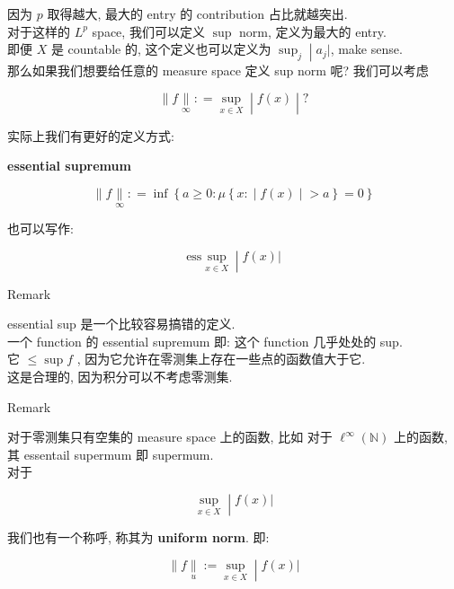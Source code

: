 \documentclass{qlnotes-export}
\begin{document}
因为 \(p\) 取得越大, 最大的 entry 的 contribution 占比就越突出.\\
对于这样的 \(L^{p}\) space, 我们可以定义 \(\sup\) norm, 定义为最大的 entry.\\
即便 \(X\) 是 countable 的, 这个定义也可以定义为 \(\left. \sup_{j} \middle| a_{j}| \right.\), make sense.\\
那么如果我们想要给任意的 measure space 定义 sup norm 呢? 我们可以考虑

\[\left. \parallel f\underset{\infty}{\parallel}: = \sup\limits_{x \in X} \middle| f(x) \middle| ? \right.\]

实际上我们有更好的定义方式:

\begin{definition}{\protect{}\label{kn-essential-supremum}{\textbf{essential
supremum}}}

\[\parallel f\underset{\infty}{\parallel}: = \inf\left\{ {a \geq 0:\mu\left\{ x: \middle| f(x) \middle| > a \right\} = 0} \right\}\]

也可以写作:

\[\left. \text{ess}\sup\limits_{x \in X} \middle| f(x)| \right.\]

\end{definition}

\begin{qlremark}{Remark}

essential sup 是一个比较容易搞错的定义.\\
一个 function 的 essential supremum 即: 这个 function 几乎处处的 sup.\\
它 \(\leq \sup f\) , 因为它允许在零测集上存在一些点的函数值大于它.\\
这是合理的, 因为积分可以不考虑零测集.\\

\end{qlremark}

\begin{qlremark}{Remark}

对于零测集只有空集的 measure space 上的函数, 比如 对于 \(\ell^{\infty}({\mathbb{N}})\) 上的函数, 其 essentail supermum 即 supermum.\\
对于

\[\left. \sup\limits_{x \in X} \middle| f(x)| \right.\]

我们也有一个称呼, 称其为 \textbf{uniform norm}. 即:

\[\left. \parallel f\underset{u}{\parallel} := \sup\limits_{x \in X} \middle| f(x)| \right.\]

\end{qlremark}
\end{document}
